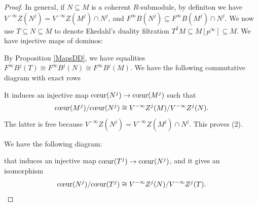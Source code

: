 \documentclass[a4paper,12pt,twoside]{report}
\begin{document}
\begin{proof}
In general, if $N \subseteq M$ is a coherent $R$-submodule, by definiton we have 
$V^{-\infty}Z(N^j)=V^{-\infty}Z(M^j)\cap N^j$, and $F^\infty B(N^j)\subseteq F^\infty B(M^j)\cap N^j$. 
We now use $T\subseteq N\subseteq M$ to denote Ekedahl's duality filtration $T^2M\subseteq M[p^\infty]\subseteq M$. 
We have injective maps of dominos: 
\begin{center}
\end{center}
By Proposition \ref{MapsDD}, we have equalities $F^{\infty}B^j(T)\cong F^{\infty}B^j(N)\cong F^{\infty}B^j(M)$. 
We have the following commutative diagram with exact rows
\begin{center}
\end{center}
It induces an injective map $\text{\rm {c\oe ur}}(N^j)\rightarrow \text{\rm {c\oe ur}}(M^j)$ such that 
\[ \text{\rm {c\oe ur}}(M^j)/\text{\rm {c\oe ur}}(N^j)\cong V^{-\infty}Z^j(M)/V^{-\infty}Z^j(N).\] 
The latter is free because $V^{-\infty}Z(N^j)=V^{-\infty}Z(M^j)\cap N^j$. This proves (2). 

We have the following diagram: 
\begin{center}
\end{center}
that induces an injective map $\text{\rm {c\oe ur}}(T^j)\rightarrow \text{\rm {c\oe ur}}(N^j)$, and it gives an isomorphism
\[\text{\rm {c\oe ur}}(N^j)/\text{\rm {c\oe ur}}(T^j)\cong V^{-\infty}Z^j(N)/V^{-\infty}Z^j(T).\]


\end{proof}
\end{document}
